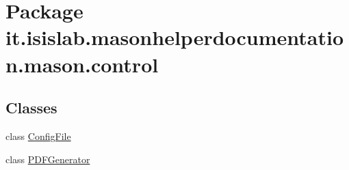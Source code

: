 \hypertarget{namespaceit_1_1isislab_1_1masonhelperdocumentation_1_1mason_1_1control}{\section{Package it.\-isislab.\-masonhelperdocumentation.\-mason.\-control}
\label{namespaceit_1_1isislab_1_1masonhelperdocumentation_1_1mason_1_1control}
}
\subsection*{Classes}
\begin{DoxyCompactItemize}
\item 
class \hyperlink{classit_1_1isislab_1_1masonhelperdocumentation_1_1mason_1_1control_1_1_config_file}{Config\-File}
\item 
class \hyperlink{classit_1_1isislab_1_1masonhelperdocumentation_1_1mason_1_1control_1_1_p_d_f_generator}{P\-D\-F\-Generator}
\end{DoxyCompactItemize}
